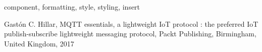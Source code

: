 \documentclass[conference]{IEEEtran}
\begin{document}
\begin{IEEEkeywords}
component, formatting, style, styling, insert
\end{IEEEkeywords}

















\begin{thebibliography}{00}
  Gastón C. Hillar, MQTT essentials, a lightweight IoT protocol : the preferred IoT publish-subscribe lightweight messaging protocol, Packt Publishing, Birmingham, United Kingdom, 2017 
\end{thebibliography}
\vspace{12pt}
\end{document}
